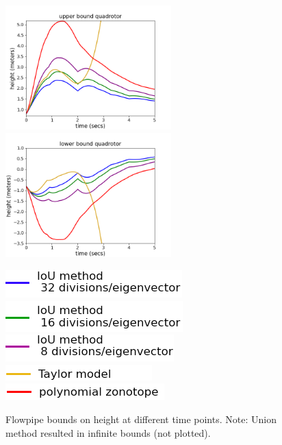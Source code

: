%
\begin{figure}
\includegraphics[width=6.4cm,height=4.8cm]{quadrotorImages/ubToolHeight.png}%
\includegraphics[width=6.4cm,height=4.8cm]{quadrotorImages/lbToolHeight.png}

\includegraphics[scale = 0.41]{quadrotorImages/leg1.png}~
  \includegraphics[scale = 0.41]{quadrotorImages/leg2.png}~
  \includegraphics[scale = 0.41]{quadrotorImages/leg3.png}
\includegraphics[scale = 0.41]{quadrotorImages/leg4.png}~
  \includegraphics[scale = 0.41]{quadrotorImages/leg5.png}
\caption{Flowpipe bounds on height at different time points.
Note: Union method resulted in infinite bounds (not plotted).}\label{fig:flowquadrotor}
\end{figure}
% 
